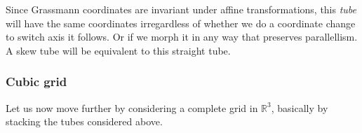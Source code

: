 \documentclass[a4paper,12pt]{book}
\theoremstyle{plain}
\theoremstyle{definition}
\begin{document}
Since Grassmann coordinates are invariant under affine transformations, this \emph{tube} will have
the same coordinates irregardless of whether we do a coordinate change to switch axis it follows.
Or if we morph it in any way that preserves parallellism. A skew tube will be equivalent to this
straight tube.

\subsubsection{Cubic grid} %
\label{ssub:cubic_grid}
Let us now move further by considering a complete grid in \( \mathbb{R}^3 \), basically by stacking
the tubes considered above.
\begin{figure}
\begin{center}
\end{center}
\end{figure}
\end{document}

